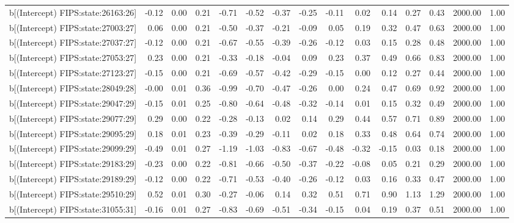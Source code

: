 \begin{table}[ht]
\begin{tabular}{rrrrrrrrrrrrrrr}
  b[(Intercept) FIPS:state:26163:26] & -0.12 & 0.00 & 0.21 & -0.71 & -0.52 & -0.37 & -0.25 & -0.11 & 0.02 & 0.14 & 0.27 & 0.43 & 2000.00 & 1.00 \\ 
  b[(Intercept) FIPS:state:27003:27] & 0.06 & 0.00 & 0.21 & -0.50 & -0.37 & -0.21 & -0.09 & 0.05 & 0.19 & 0.32 & 0.47 & 0.63 & 2000.00 & 1.00 \\ 
  b[(Intercept) FIPS:state:27037:27] & -0.12 & 0.00 & 0.21 & -0.67 & -0.55 & -0.39 & -0.26 & -0.12 & 0.03 & 0.15 & 0.28 & 0.48 & 2000.00 & 1.00 \\ 
  b[(Intercept) FIPS:state:27053:27] & 0.23 & 0.00 & 0.21 & -0.33 & -0.18 & -0.04 & 0.09 & 0.23 & 0.37 & 0.49 & 0.66 & 0.83 & 2000.00 & 1.00 \\ 
  b[(Intercept) FIPS:state:27123:27] & -0.15 & 0.00 & 0.21 & -0.69 & -0.57 & -0.42 & -0.29 & -0.15 & 0.00 & 0.12 & 0.27 & 0.44 & 2000.00 & 1.00 \\ 
  b[(Intercept) FIPS:state:28049:28] & -0.00 & 0.01 & 0.36 & -0.99 & -0.70 & -0.47 & -0.26 & 0.00 & 0.24 & 0.47 & 0.69 & 0.92 & 2000.00 & 1.00 \\ 
  b[(Intercept) FIPS:state:29047:29] & -0.15 & 0.01 & 0.25 & -0.80 & -0.64 & -0.48 & -0.32 & -0.14 & 0.01 & 0.15 & 0.32 & 0.49 & 2000.00 & 1.00 \\ 
  b[(Intercept) FIPS:state:29077:29] & 0.29 & 0.00 & 0.22 & -0.28 & -0.13 & 0.02 & 0.14 & 0.29 & 0.44 & 0.57 & 0.71 & 0.89 & 2000.00 & 1.00 \\ 
  b[(Intercept) FIPS:state:29095:29] & 0.18 & 0.01 & 0.23 & -0.39 & -0.29 & -0.11 & 0.02 & 0.18 & 0.33 & 0.48 & 0.64 & 0.74 & 2000.00 & 1.00 \\ 
  b[(Intercept) FIPS:state:29099:29] & -0.49 & 0.01 & 0.27 & -1.19 & -1.03 & -0.83 & -0.67 & -0.48 & -0.32 & -0.15 & 0.03 & 0.18 & 2000.00 & 1.00 \\ 
  b[(Intercept) FIPS:state:29183:29] & -0.23 & 0.00 & 0.22 & -0.81 & -0.66 & -0.50 & -0.37 & -0.22 & -0.08 & 0.05 & 0.21 & 0.29 & 2000.00 & 1.00 \\ 
  b[(Intercept) FIPS:state:29189:29] & -0.12 & 0.00 & 0.22 & -0.71 & -0.53 & -0.40 & -0.26 & -0.12 & 0.03 & 0.16 & 0.33 & 0.47 & 2000.00 & 1.00 \\ 
  b[(Intercept) FIPS:state:29510:29] & 0.52 & 0.01 & 0.30 & -0.27 & -0.06 & 0.14 & 0.32 & 0.51 & 0.71 & 0.90 & 1.13 & 1.29 & 2000.00 & 1.00 \\ 
  b[(Intercept) FIPS:state:31055:31] & -0.16 & 0.01 & 0.27 & -0.83 & -0.69 & -0.51 & -0.34 & -0.15 & 0.04 & 0.19 & 0.37 & 0.51 & 2000.00 & 1.00 \\ 

\end{tabular}
\end{table}
